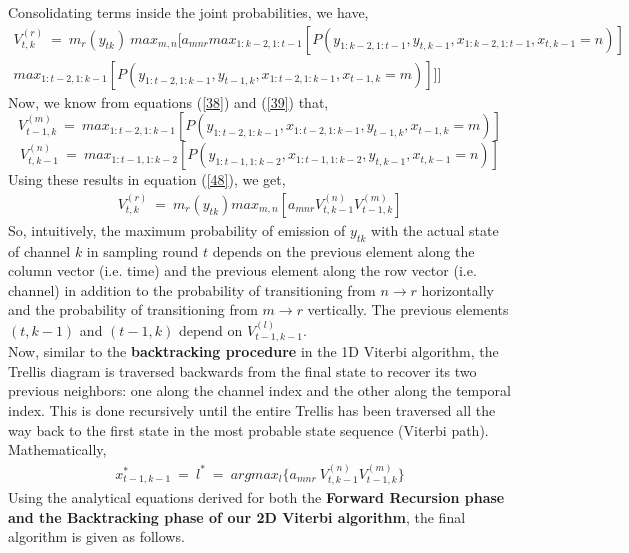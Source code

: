 \documentclass[12pt, draftcls, onecolumn]{IEEEtran}
\begin{document}
Consolidating terms inside the joint probabilities, we have,
\begin{equation}\label{48}
    \begin{aligned}
         V_{t,k}^{(r)}\ =\ m_r(y_{tk})\ max_{m,n}[a_{mnr}max_{1:k-2,1:t-1}[P(y_{1:k-2,1:t-1},y_{t,k-1},x_{1:k-2,1:t-1},x_{t,k-1}=n)]\\max_{1:t-2,1:k-1}[P(y_{1:t-2,1:k-1},y_{t-1,k},x_{1:t-2,1:k-1},x_{t-1,k}=m)]]]
    \end{aligned}
\end{equation}
Now, we know from equations (\ref{38}) and (\ref{39}) that,
\begin{equation*}
   V_{t-1,k}^{(m)}\ =\ max_{1:t-2,1:k-1}[P(y_{1:t-2,1:k-1},x_{1:t-2,1:k-1},y_{t-1,k},x_{t-1,k}=m)]
\end{equation*}
\begin{equation*}
    V_{t,k-1}^{(n)}\ =\ max_{1:t-1,1:k-2}[P(y_{1:t-1,1:k-2},x_{1:t-1,1:k-2},y_{t,k-1},x_{t,k-1}=n)]
\end{equation*}
Using these results in equation (\ref{48}), we get,
\begin{equation}\label{49}
    \begin{aligned}
         V_{t,k}^{(r)}\ =\ m_r(y_{tk})max_{m,n}[a_{mnr}V_{t,k-1}^{(n)}V_{t-1,k}^{(m)}]
    \end{aligned}
\end{equation}
So, intuitively, the maximum probability of emission of $y_{tk}$ with the actual state of channel $k$ in sampling round $t$ depends on the previous element along the column vector (i.e. time) and the previous element along the row vector (i.e. channel) in addition to the probability of transitioning from $n \longrightarrow r$ horizontally and the probability of transitioning from $m \longrightarrow r$ vertically. The previous elements $(t,k-1)$ and $(t-1,k)$ depend on $V_{t-1,k-1}^{(l)}$.
\\Now, similar to the \textbf{backtracking procedure} in the 1D Viterbi algorithm, the Trellis diagram is traversed backwards from the final state to recover its two previous neighbors: one along the channel index and the other along the temporal index. This is done recursively until the entire Trellis has been traversed all the way back to the first state in the most probable state sequence (Viterbi path).
\\Mathematically,
\begin{equation}\label{50}
    \begin{aligned}
         x_{t-1,k-1}^*\ =\ l^*\ =\ argmax_{l}\{a_{mnr}\ V_{t,k-1}^{(n)}V_{t-1,k}^{(m)}\}
    \end{aligned}
\end{equation}
Using the analytical equations derived for both the \textbf{Forward Recursion phase and the Backtracking phase of our 2D Viterbi algorithm}, the final algorithm is given as follows.
\end{document}
